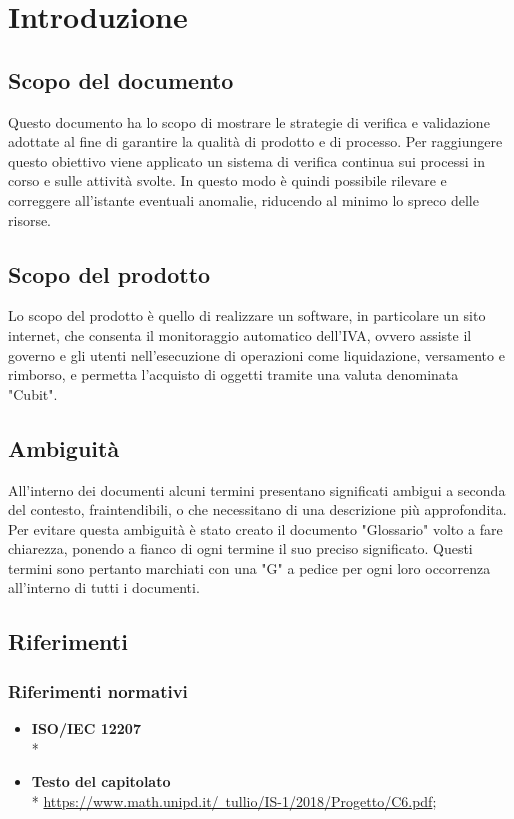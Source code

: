 \section{Introduzione}
\subsection{Scopo del documento}
Questo documento ha lo scopo di mostrare le strategie di verifica e validazione adottate al fine di garantire la qualità di prodotto e di processo. Per raggiungere questo obiettivo viene applicato un sistema di verifica continua sui processi in corso e sulle attività svolte. In questo modo è quindi possibile rilevare e correggere all'istante eventuali anomalie, riducendo al minimo lo spreco delle risorse.
\subsection{Scopo del prodotto}
Lo scopo del prodotto è quello di realizzare un software, in particolare un sito internet, che consenta il monitoraggio automatico dell'IVA, ovvero assiste il governo e gli utenti nell'esecuzione di operazioni come liquidazione, versamento e rimborso, e permetta l'acquisto di oggetti tramite una valuta denominata "Cubit"\glosp{}.
\subsection{Ambiguità}
All’interno dei documenti alcuni termini presentano significati ambigui  a seconda del contesto, fraintendibili, o che necessitano di una descrizione più approfondita. Per evitare questa ambiguità è stato creato il documento "Glossario" volto a fare chiarezza, ponendo a fianco di ogni termine il suo preciso significato. Questi termini sono pertanto marchiati con una "G" a pedice per ogni loro occorrenza all'interno di tutti i documenti.
\subsection{Riferimenti}
\subsubsection{Riferimenti normativi}
\begin{itemize}
\item \textbf{ISO/IEC 12207} \\* %
\item \textbf{Testo del capitolato} \\*  \href{https://www.math.unipd.it/~tullio/IS-1/2018/Progetto/C6.pdf}{https://www.math.unipd.it/~tullio/IS-1/2018/Progetto/C6.pdf};
\end{itemize}
